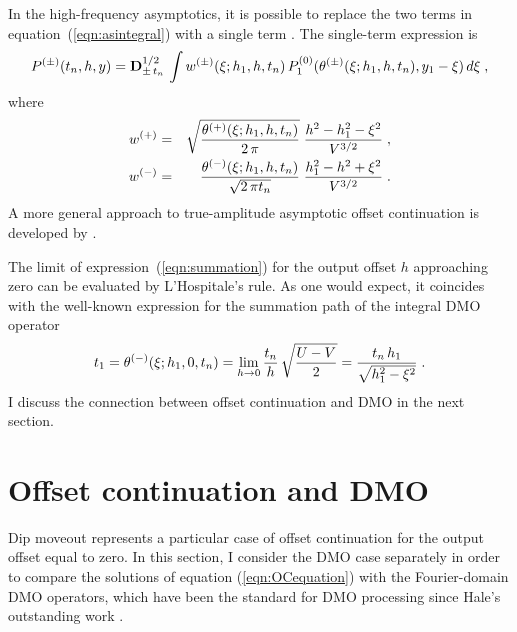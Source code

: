 In the high-frequency asymptotics, it is possible to replace the two
terms in equation~(\ref{eqn:asintegral}) with a single term
\cite[]{GEO68-03-10321042}. The single-term expression is
\begin{equation}
P^{(\pm)}(t_n,h,y)  = 
{\bf D}^{1/2}_{\pm\,t_n}\,\int w^{(\pm)}(\xi;h_1,h,t_n)\,
P^{(0)}_1(\theta^{(\pm)}(\xi;h_1,h,t_n),y_1-\xi)\,d\xi\;,
\end{equation}
where
\begin{eqnarray}
w^{(+)} & = & \sqrt{\theta^{(+)}(\xi;h_1,h,t_n) \over {2\,\pi}}\;
{{h^2-h_1^2-\xi^2} \over {V^{3/2}}}\;, 
\label{eqn:wOC12} \\
w^{(-)} & = & {{\theta^{(-)}(\xi;h_1,h,t_n)} \over \sqrt{2\,\pi t_n}}\;
{{h_1^2-h^2 +\xi^2} \over {V^{3/2}}}\;. 
\label{eqn:wOC21} 
\end{eqnarray}
A more general approach to true-amplitude asymptotic offset
continuation is developed by \cite{tygel}.

The limit of expression~(\ref{eqn:summation}) for the output offset $h$
approaching zero can be evaluated by L'Hospitale's rule. As one would
expect, it coincides with the well-known expression for the summation
path of the integral DMO operator
\cite[]{GPR29-03-03740406}
\begin{equation}
t_1=\theta^{(-)}(\xi;h_1,0,t_n)=
\lim_{h \rightarrow 0} {{t_n \over h}\,\sqrt{{U - V} \over 2 }}=
{{t_n\,h_1} \over \sqrt{h_1^2-\xi^2}}\;.
\label{eqn:DMOsummation}
\end{equation}
I discuss the connection between offset continuation and DMO in the
next section.

\section{Offset continuation and DMO}

Dip moveout represents a particular case of offset continuation for
the output offset equal to zero. In this section, I consider the DMO
case separately in order to compare the solutions of equation
(\ref{eqn:OCequation}) with the Fourier-domain DMO operators, which
have been the standard for DMO processing since Hale's outstanding
work \cite[]{Hale.sepphd.36,GEO49-06-07410757}.


